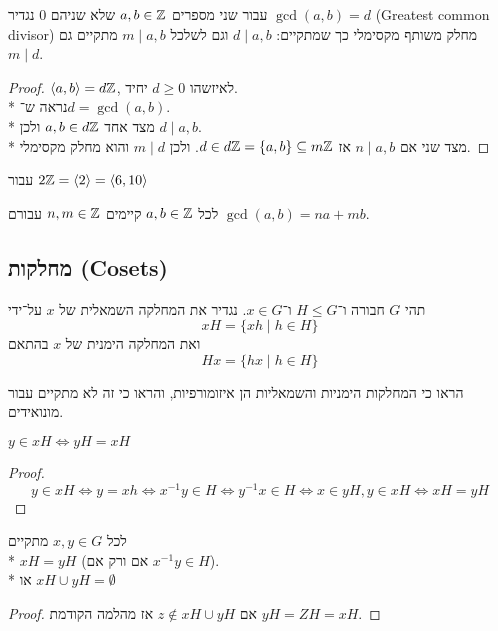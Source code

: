 \begin{definition}[gcb]
	עבור שני מספרים $a, b \in \mathbb{Z}$ שלא שניהם $0$ נגדיר $\gcd(a, b) = d$ (Greatest common divisor) מחלק משותף מקסימלי כך שמתקיים:
	$d \mid a, b$ וגם לשלכל $m \mid a, b$ מתקיים גם $m \mid d$.
\end{definition}
\begin{proof}
	$\langle a, b \rangle = d\mathbb{Z}$, לאיזשהו $d \ge 0$ יחיד. \\*
	נראה ש־$d = \gcd(a, b)$. \\*
	מצד אחד $a, b \in d \mathbb{Z}$ ולכן $d \mid a, b$. \\*
	מצד שני אם $n \mid a, b$ אז $d \in d \mathbb{Z} = \{a, b \} \subseteq m \mathbb{Z}$. ולכן $m \mid d$ והוא מחלק מקסימלי.
\end{proof}
 \begin{example}
	 עבור $2 \mathbb{Z} = \langle 2 \rangle = \langle 6, 10 \rangle$
 \end{example}
 \begin{conclusion}
	 לכל $a, b \in \mathbb{Z}$ קיימים $n, m \in \mathbb{Z}$ עבורם $\gcd(a, b) = na + mb$.
\end{conclusion}

\subsection{מחלקות (Cosets)}
\begin{definition}
	תהי $G$ חבורה ו־$H \le G$ ו־$x \in G$. 
	נגדיר את המחלקה השמאלית של $x$ על־ידי
	\[
		x H = \{x h \mid h \in H\}
	\]
	ואת המחלקה הימנית של $x$ בהתאם
	\[
		H x = \{h x \mid h \in H\}
	\]
\end{definition}
\begin{exercise}
	הראו כי המחלקות הימניות והשמאליות הן איזומורפיות, והראו כי זה לא מתקיים עבור מונואידים.
\end{exercise}

\begin{lemma}
	$y \in xH \iff yH = xH$
\end{lemma}
\begin{proof}
	\[
		y \in xH
		\iff  y = x h
		\iff x^{-1} y \in H
		\iff y^{-1} x \in H
		\iff x \in yH, y \in xH
		\iff xH = yH
	\]
\end{proof}
\begin{conclusion}
	לכל $x, y \in G$ מתקיים \\*
	$x H = y H$ (אם ורק אם $x^{-1} y \in H$). \\*
	או $xH \cup yH = \emptyset$
\end{conclusion}
\begin{proof}
	אם $z \not\in xH \cup yH$ אז מהלמה הקודמת $yH = ZH = xH$.
\end{proof}

